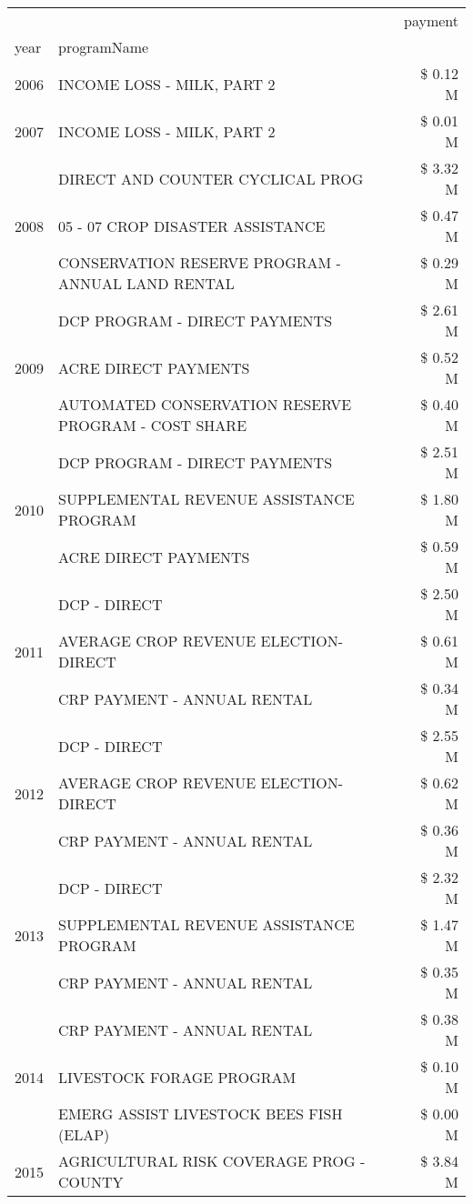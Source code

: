\begin{tabular}{llr}
\toprule
 &  & payment \\
year & programName &  \\
\midrule
2006 & INCOME LOSS - MILK, PART 2 & \$ 0.12 M \\
\cline{1-3}
2007 & INCOME LOSS - MILK, PART 2 & \$ 0.01 M \\
\cline{1-3}
\multirow[t]{3}{*}{2008} & DIRECT AND COUNTER CYCLICAL PROG & \$ 3.32 M \\
 & 05 - 07 CROP DISASTER ASSISTANCE & \$ 0.47 M \\
 & CONSERVATION RESERVE PROGRAM - ANNUAL LAND RENTAL & \$ 0.29 M \\
\cline{1-3}
\multirow[t]{3}{*}{2009} & DCP PROGRAM - DIRECT PAYMENTS & \$ 2.61 M \\
 & ACRE DIRECT PAYMENTS & \$ 0.52 M \\
 & AUTOMATED CONSERVATION RESERVE PROGRAM - COST SHARE & \$ 0.40 M \\
\cline{1-3}
\multirow[t]{3}{*}{2010} & DCP PROGRAM - DIRECT PAYMENTS & \$ 2.51 M \\
 & SUPPLEMENTAL REVENUE ASSISTANCE PROGRAM & \$ 1.80 M \\
 & ACRE DIRECT PAYMENTS & \$ 0.59 M \\
\cline{1-3}
\multirow[t]{3}{*}{2011} & DCP - DIRECT & \$ 2.50 M \\
 & AVERAGE CROP REVENUE ELECTION-DIRECT & \$ 0.61 M \\
 & CRP PAYMENT - ANNUAL RENTAL & \$ 0.34 M \\
\cline{1-3}
\multirow[t]{3}{*}{2012} & DCP - DIRECT & \$ 2.55 M \\
 & AVERAGE CROP REVENUE ELECTION-DIRECT & \$ 0.62 M \\
 & CRP PAYMENT - ANNUAL RENTAL & \$ 0.36 M \\
\cline{1-3}
\multirow[t]{3}{*}{2013} & DCP - DIRECT & \$ 2.32 M \\
 & SUPPLEMENTAL REVENUE ASSISTANCE PROGRAM & \$ 1.47 M \\
 & CRP PAYMENT - ANNUAL RENTAL & \$ 0.35 M \\
\cline{1-3}
\multirow[t]{3}{*}{2014} & CRP PAYMENT - ANNUAL RENTAL & \$ 0.38 M \\
 & LIVESTOCK FORAGE PROGRAM & \$ 0.10 M \\
 & EMERG ASSIST LIVESTOCK BEES FISH (ELAP) & \$ 0.00 M \\
\cline{1-3}
\multirow[t]{3}{*}{2015} & AGRICULTURAL RISK COVERAGE PROG - COUNTY & \$ 3.84 M \\

\end{tabular}
